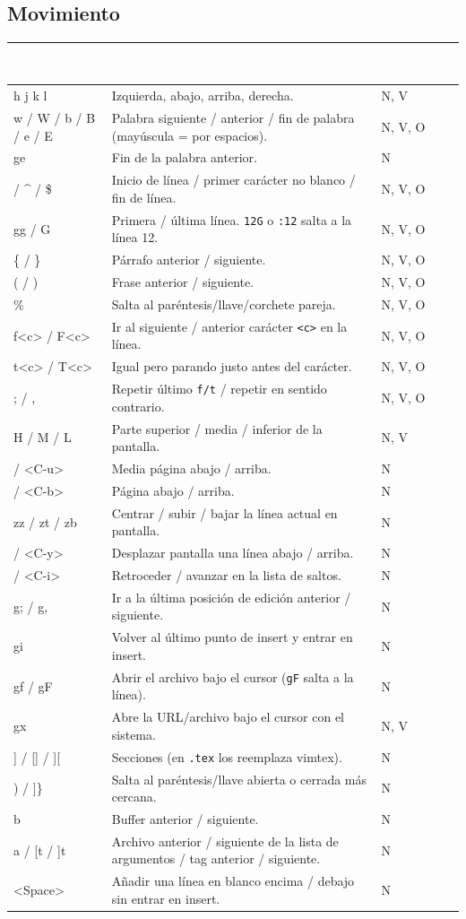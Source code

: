 \documentclass[8pt,a4paper,landscape]{extarticle}
\newcommand{\kk}[1]{\texttt{#1}}
\newcommand{\ca}{\textasciicircum{}}
\newenvironment{cht}{%
  \begin{longtable}{>{\raggedright\arraybackslash\ttfamily}p{0.27\textwidth}
                    >{\raggedright\arraybackslash}p{0.46\textwidth}
                    >{\raggedright\arraybackslash}p{0.21\textwidth}}
  \rowcolor{accent}\textcolor{white}{\textbf{\rmfamily Comando / atajo}} &
  \textcolor{white}{\textbf{Qué hace}} & \textcolor{white}{\textbf{Dónde funciona}} \\
  \endhead
}{\end{longtable}}
\newcommand{\rr}[3]{#1 & #2 & #3 \\}
\newcommand{\rg}[3]{\rowcolor{rowgray}\relax #1 & #2 & #3 \\}
\let\oldsubsection\subsection
\renewcommand{\subsection}{\Needspace{9\baselineskip}\oldsubsection}
\begin{document}
\subsection{Movimiento}
\begin{cht}
\rg{h j k l}{Izquierda, abajo, arriba, derecha.}{N, V}
\rr{w / W / b / B / e / E}{Palabra siguiente / anterior / fin de palabra (mayúscula = por espacios).}{N, V, O}
\rg{ge}{Fin de la palabra anterior.}{N}
\rr{0 / \ca{} / \$}{Inicio de línea / primer carácter no blanco / fin de línea.}{N, V, O}
\rg{gg / G}{Primera / última línea. \kk{12G} o \kk{:12} salta a la línea 12.}{N, V, O}
\rr{\{ / \}}{Párrafo anterior / siguiente.}{N, V, O}
\rg{( / )}{Frase anterior / siguiente.}{N, V, O}
\rr{\%}{Salta al paréntesis/llave/corchete pareja.}{N, V, O}
\rg{f<c> / F<c>}{Ir al siguiente / anterior carácter \kk{<c>} en la línea.}{N, V, O}
\rr{t<c> / T<c>}{Igual pero parando justo antes del carácter.}{N, V, O}
\rg{; / ,}{Repetir último \kk{f/t} / repetir en sentido contrario.}{N, V, O}
\rr{H / M / L}{Parte superior / media / inferior de la pantalla.}{N, V}
\rg{<C-d> / <C-u>}{Media página abajo / arriba.}{N}
\rr{<C-f> / <C-b>}{Página abajo / arriba.}{N}
\rg{zz / zt / zb}{Centrar / subir / bajar la línea actual en pantalla.}{N}
\rr{<C-e> / <C-y>}{Desplazar pantalla una línea abajo / arriba.}{N}
\rg{<C-o> / <C-i>}{Retroceder / avanzar en la lista de saltos.}{N}
\rr{g; / g,}{Ir a la última posición de edición anterior / siguiente.}{N}
\rg{gi}{Volver al último punto de insert y entrar en insert.}{N}
\rr{gf / gF}{Abrir el archivo bajo el cursor (\kk{gF} salta a la línea).}{N}
\rg{gx}{Abre la URL/archivo bajo el cursor con el sistema.}{N, V}
\rr{[[ / ]] / [] / ][}{Secciones (en \kk{.tex} los reemplaza vimtex).}{N}
\rg{[( / [\{ / ]) / ]\}}{Salta al paréntesis/llave abierta o cerrada más cercana.}{N}
\rr{[b / ]b}{Buffer anterior / siguiente.}{N}
\rg{[a / ]a / [t / ]t}{Archivo anterior / siguiente de la lista de argumentos / tag anterior / siguiente.}{N}
\rr{[<Space> / ]<Space>}{Añadir una línea en blanco encima / debajo sin entrar en insert.}{N}
\end{cht}
\end{document}
